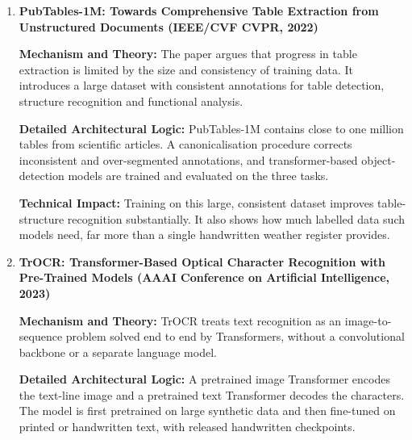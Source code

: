 \begin{enumerate}
\textbf{Mechanism and Theory:} CascadeTabNet performs table detection and cell-level structure recognition with a single deep model, treating tables and cells as objects to be detected and segmented in the document image.

\textbf{Detailed Architectural Logic:} The network is based on a Cascade Mask R-CNN with a high-resolution backbone, trained with iterative transfer learning and image augmentation. It distinguishes bordered from borderless tables, and line-based post-processing recovers the structure of borderless tables.

\textbf{Technical Impact:} CascadeTabNet achieved state-of-the-art results on public table-detection benchmarks and became a standard component of table-digitization pipelines, including the semi-supervised historical-table work of Singh and Middleton \cite{ref2}.

\item \textbf{PubTables-1M: Towards Comprehensive Table Extraction from Unstructured Documents (IEEE/CVF CVPR, 2022)}

\textbf{Mechanism and Theory:} The paper argues that progress in table extraction is limited by the size and consistency of training data. It introduces a large dataset with consistent annotations for table detection, structure recognition and functional analysis.

\textbf{Detailed Architectural Logic:} PubTables-1M contains close to one million tables from scientific articles. A canonicalisation procedure corrects inconsistent and over-segmented annotations, and transformer-based object-detection models are trained and evaluated on the three tasks.

\textbf{Technical Impact:} Training on this large, consistent dataset improves table-structure recognition substantially. It also shows how much labelled data such models need, far more than a single handwritten weather register provides.

\item \textbf{TrOCR: Transformer-Based Optical Character Recognition with Pre-Trained Models (AAAI Conference on Artificial Intelligence, 2023)}

\textbf{Mechanism and Theory:} TrOCR treats text recognition as an image-to-sequence problem solved end to end by Transformers, without a convolutional backbone or a separate language model.

\textbf{Detailed Architectural Logic:} A pretrained image Transformer encodes the text-line image and a pretrained text Transformer decodes the characters. The model is first pretrained on large synthetic data and then fine-tuned on printed or handwritten text, with released handwritten checkpoints.


\end{enumerate}
